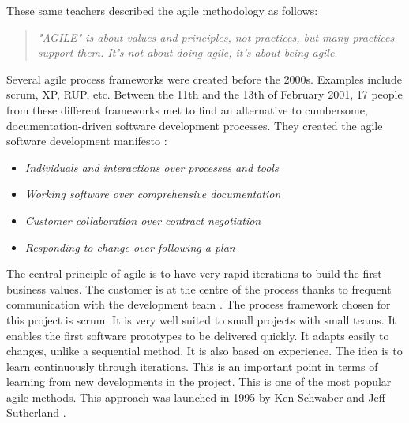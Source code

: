 These same teachers \cite{course_MA_ITProMan} described the agile methodology as follows:
\begin{quote}
    \textit{"AGILE" is about values and principles, not practices, but many practices support them. It's not about doing agile, it's about being agile}.
\end{quote}
Several agile process frameworks were created before the 2000s. Examples include \gls{scrum}, XP, RUP, etc. Between the 11th and the 13th of February 2001, 17 people from these different frameworks met to find an alternative to cumbersome, documentation-driven software development processes. They created the agile software development manifesto \cite{manifesto_agile} :
\begin{itemize}
    \item[] \textit{Individuals and interactions over processes and tools}
    \item[] \textit{Working software over comprehensive documentation}
    \item[] \textit{Customer collaboration over contract negotiation}
    \item[] \textit{Responding to change over following a plan}
\end{itemize}
The central principle of agile is to have very rapid iterations to build the first business values. The customer is at the centre of the process thanks to frequent communication with the development team \cite{course_MA_ITProMan}. The process framework chosen for this project is \gls{scrum}. It is very well suited to small projects with small teams. It enables the first software prototypes to be delivered quickly. It adapts easily to changes, unlike a sequential method. It is also based on experience. The idea is to learn continuously through iterations. This is an important point in terms of learning from new developments in the project. This is one of the most popular agile methods. This approach was launched in 1995 by Ken Schwaber and Jeff Sutherland \cite{scrum_guide_site}.

